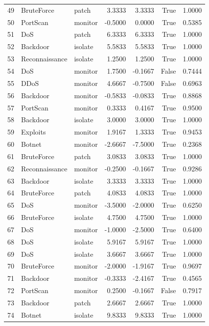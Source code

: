 \begin{table}
\begin{tabular}{rllrrrr}
49 & BruteForce & patch & 3.3333 & 3.3333 & True & 1.0000 \\
50 & PortScan & monitor & -0.5000 & 0.0000 & True & 0.5385 \\
51 & DoS & patch & 6.3333 & 6.3333 & True & 1.0000 \\
52 & Backdoor & isolate & 5.5833 & 5.5833 & True & 1.0000 \\
53 & Reconnaissance & isolate & 1.2500 & 1.2500 & True & 1.0000 \\
54 & DoS & monitor & 1.7500 & -0.1667 & False & 0.7444 \\
55 & DDoS & monitor & 4.6667 & -0.7500 & False & 0.6963 \\
56 & Backdoor & monitor & -0.5833 & -0.0833 & True & 0.8868 \\
57 & PortScan & monitor & 0.3333 & 0.4167 & True & 0.9500 \\
58 & Backdoor & isolate & 3.0000 & 3.0000 & True & 1.0000 \\
59 & Exploits & monitor & 1.9167 & 1.3333 & True & 0.9453 \\
60 & Botnet & monitor & -2.6667 & -7.5000 & True & 0.2368 \\
61 & BruteForce & patch & 3.0833 & 3.0833 & True & 1.0000 \\
62 & Reconnaissance & monitor & -0.2500 & -0.1667 & True & 0.9286 \\
63 & Backdoor & isolate & 3.3333 & 3.3333 & True & 1.0000 \\
64 & BruteForce & patch & 4.0833 & 4.0833 & True & 1.0000 \\
65 & DoS & monitor & -3.5000 & -2.0000 & True & 0.6250 \\
66 & BruteForce & isolate & 4.7500 & 4.7500 & True & 1.0000 \\
67 & DoS & monitor & -1.0000 & -2.5000 & True & 0.6400 \\
68 & DoS & isolate & 5.9167 & 5.9167 & True & 1.0000 \\
69 & DoS & isolate & 3.6667 & 3.6667 & True & 1.0000 \\
70 & BruteForce & monitor & -2.0000 & -1.9167 & True & 0.9697 \\
71 & Backdoor & monitor & -0.3333 & -2.4167 & True & 0.4565 \\
72 & PortScan & monitor & 0.2500 & -0.1667 & False & 0.7917 \\
73 & Backdoor & patch & 2.6667 & 2.6667 & True & 1.0000 \\
74 & Botnet & isolate & 9.8333 & 9.8333 & True & 1.0000 \\

\end{tabular}
\end{table}
